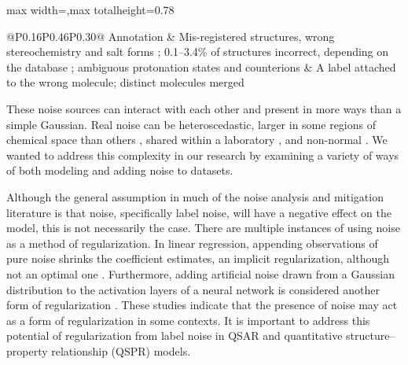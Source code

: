 \begin{table}[htbp]
\begin{adjustbox}{max width=\textwidth,max totalheight=0.78\textheight}
\begin{tabular}{@{}P{0.16\linewidth}P{0.46\linewidth}P{0.30\linewidth}@{}}
Annotation & Mis-registered structures, wrong stereochemistry and salt forms \citep{Fourches2010}; 0.1--3.4\% of structures incorrect, depending on the database \citep{Young2008}; ambiguous protonation states and counterions \citep{Bento2020} & A label attached to the wrong molecule; distinct molecules merged \\
\bottomrule
\end{tabular}
\end{adjustbox}
\caption[Sources of label noise in bioactivity data.]{Sources of label noise in bioactivity data, with reported examples and the kind of error each source produces.}
\label{tab:noise_sources}
\end{table}

These noise sources can interact with each other and present in more ways than a simple Gaussian. Real noise can be heteroscedastic, larger in some regions of chemical space than others \citep{Heid2023}, shared within a laboratory \citep{Bentz2013}, and non-normal \citep{Kruger2012}. We wanted to address this complexity in our research by examining a variety of ways of both modeling and adding noise to datasets.

Although the general assumption in much of the noise analysis and mitigation literature is that noise, specifically label noise, will have a negative effect on the model, this is not necessarily the case. There are multiple instances of using noise as a method of regularization. In linear regression, appending observations of pure noise shrinks the coefficient estimates, an implicit regularization, although not an optimal one \citep{Ullah2024}. Furthermore, adding artificial noise drawn from a Gaussian distribution to the activation layers of a neural network is considered another form of regularization \citep{Camuto2021}. These studies indicate that the presence of noise may act as a form of regularization in some contexts. It is important to address this potential of regularization from label noise in QSAR and quantitative structure--property relationship (QSPR) models.


